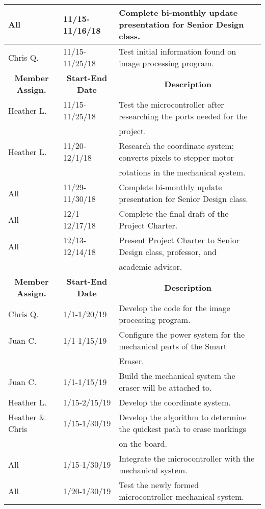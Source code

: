 \begin{table} [H]
\begin{tabular}{|l|l|l|}
		All & 11/15-11/16/18 & Complete bi-monthly update presentation for Senior Design class.\\
		\hline
		Chris Q. & 11/15-11/25/18 & Test initial information found on image processing program.\\
		\hline
		\multicolumn{1}{|c|}{\textbf{Member Assign.}} & \multicolumn{1}{|c|}{\textbf{Start-End Date}} & \multicolumn{1}{|c|}{\textbf{Description}} \\
		\hline
		Heather L. & 11/15-11/25/18 & Test the microcontroller after researching the ports needed for the \\
		& & project.\\
		\hline
		Heather L. & 11/20-12/1/18 & Research the coordinate system; converts pixels to stepper motor \\
		& & rotations in the mechanical system.\\
		\hline
		All & 11/29-11/30/18 & 
		Complete bi-monthly update presentation for Senior Design class.\\
		\hline
		All & 12/1-12/17/18 & 
		Complete the final draft of the Project Charter.\\
		\hline
		All & 12/13-12/14/18 & 
		Present Project Charter to Senior Design class, professor, and \\
		& & academic advisor.\\
		\hline
		\multicolumn{1}{|c|}{\textbf{Member Assign.}} & \multicolumn{1}{|c|}{\textbf{Start-End Date}} & \multicolumn{1}{|c|}{\textbf{Description}} \\
		\hline
		Chris Q. & 1/1-1/20/19 & Develop the code for the image processing program. \\
		\hline
		Juan C. & 1/1-1/15/19 & Configure the power system for the mechanical parts of the Smart \\
		& & Eraser. \\
		\hline
		Juan C. & 1/1-1/15/19 & Build the mechanical system the eraser will be attached to.\\
		\hline
		Heather L. & 1/15-2/15/19 & Develop the coordinate system. \\
		\hline
		Heather \& Chris & 1/15-1/30/19 & Develop the algorithm to determine the quickest path to erase markings \\
		& & on the board.\\
		\hline
		All & 1/15-1/30/19 & Integrate the microcontroller with the mechanical system.\\
		\hline
		All & 1/20-1/30/19 & Test the newly formed microcontroller-mechanical system.\\

\end{tabular}
\end{table}
